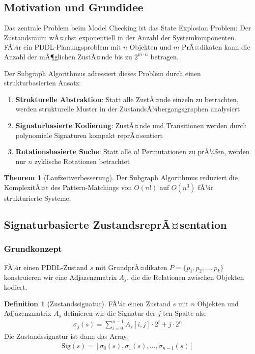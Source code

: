 ﻿\documentclass[a4paper,12pt]{article}
\theoremstyle{definition}
\newtheorem{definition}{Definition}[section]
\newtheorem{theorem}{Theorem}[section]
\begin{document}
\subsection{Motivation und Grundidee}

Das zentrale Problem beim Model Checking ist das State Explosion Problem: Der Zustandsraum wÃ¤chst exponentiell in der Anzahl der Systemkomponenten. FÃ¼r ein PDDL-Planungsproblem mit $n$ Objekten und $m$ PrÃ¤dikaten kann die Anzahl der mÃ¶glichen ZustÃ¤nde bis zu $2^{m \cdot n}$ betragen.

Der Subgraph Algorithmus adressiert dieses Problem durch einen strukturbasierten Ansatz:
\begin{enumerate}
	\item \textbf{Strukturelle Abstraktion}: Statt alle ZustÃ¤nde einzeln zu betrachten, werden strukturelle Muster in der ZustandsÃ¼bergangsgraphen analysiert
	\item \textbf{Signaturbasierte Kodierung}: ZustÃ¤nde und Transitionen werden durch polynomiale Signaturen kompakt reprÃ¤sentiert
	\item \textbf{Rotationsbasierte Suche}: Statt alle $n!$ Permutationen zu prÃ¼fen, werden nur $n$ zyklische Rotationen betrachtet
\end{enumerate}

\begin{theorem}[Laufzeitverbesserung]
	Der Subgraph Algorithmus reduziert die KomplexitÃ¤t des Pattern-Matchings von $O(n!)$ auf $O(n^3)$ fÃ¼r strukturierte Systeme.
\end{theorem}

\subsection{Signaturbasierte ZustandsreprÃ¤sentation}

\subsubsection{Grundkonzept}

FÃ¼r einen PDDL-Zustand $s$ mit GrundprÃ¤dikaten $P = \{p_1, p_2, \ldots, p_k\}$ konstruieren wir eine Adjazenzmatrix $A_s$, die die Relationen zwischen Objekten kodiert.

\begin{definition}[Zustandssignatur]
	FÃ¼r einen Zustand $s$ mit $n$ Objekten und Adjazenzmatrix $A_s$ definieren wir die Signatur der $j$-ten Spalte als:
	\begin{align}
	\sigma_j(s) = \sum_{i=0}^{n-1} A_s[i,j] \cdot 2^i + j \cdot 2^n
	\end{align}
	Die Zustandssignatur ist dann das Array:
	\begin{align}
	\text{Sig}(s) = [\sigma_0(s), \sigma_1(s), \ldots, \sigma_{n-1}(s)]
	\end{align}
\end{definition}
\end{document}
